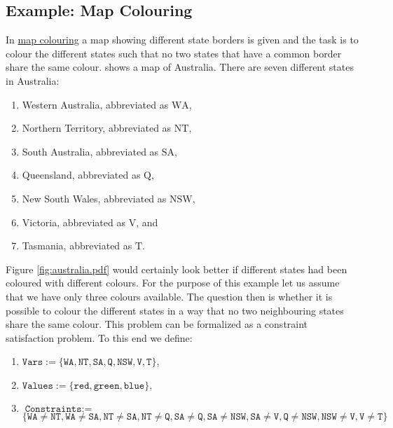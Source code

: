 \subsection{Example: Map Colouring}
In \href{https://en.wikipedia.org/wiki/Four_color_theorem}{map colouring} a map showing different state
borders is given and the task is to colour the different states such that no two states that have a common
border share the same colour.   shows a map of Australia.  There are seven different
states in Australia:
\begin{enumerate}
\item Western Australia, abbreviated as $\mathrm{WA}$,
\item Northern Territory, abbreviated as $\mathrm{NT}$,
\item South Australia, abbreviated as $\mathrm{SA}$,
\item Queensland, abbreviated as $\mathrm{Q}$,
\item New South Wales, abbreviated as $\mathrm{NSW}$,
\item Victoria, abbreviated as $\mathrm{V}$, and
\item Tasmania, abbreviated as $\mathrm{T}$.
\end{enumerate}
Figure \ref{fig:australia.pdf} would certainly look better if different states had been coloured with different
colours.  For the purpose of 
this example let us assume that we have only three colours available.  The question then is whether it is 
possible to colour the different states in a way that no two neighbouring states share the same colour.  This
problem can be formalized as a constraint satisfaction problem.  To this end we define:
\begin{enumerate}
\item $\texttt{Vars} := \{ \mathtt{WA}, \mathtt{NT}, \mathtt{SA}, \mathtt{Q}, \mathtt{NSW}, \mathtt{V}, \mathtt{T} \}$,
\item $\texttt{Values} := \{ \texttt{red}, \texttt{green}, \texttt{blue} \}$,
\item $\texttt{Constraints} := $ \\[0.1cm]
      \hspace*{0.0cm}
      $\bigl\{ \mathtt{WA} \not= \mathtt{NT}, \mathtt{WA} \not= \mathtt{SA},
                 \mathtt{NT} \not= \mathtt{SA}, \mathtt{NT} \not= \mathtt{Q},
                 \mathtt{SA} \not= \mathtt{Q},  \mathtt{SA} \not= \mathtt{NSW}, \mathtt{SA} \not= \mathtt{V}, 
                 \mathtt{Q}  \not= \mathtt{NSW},
                 \mathtt{NSW}\not= \mathtt{V}, 
                 \mathtt{V}  \not= \mathtt{T}
       \bigr\}
      $
\end{enumerate}
